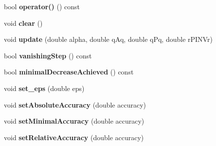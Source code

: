 \begin{DoxyCompactItemize}
\item 
\hypertarget{classSpacy_1_1CG_1_1TerminationCriterion_ab109eb287dd3622db54bbbdf0a55660a}{bool {\bfseries operator()} () const }\label{classSpacy_1_1CG_1_1TerminationCriterion_ab109eb287dd3622db54bbbdf0a55660a}

\item 
\hypertarget{classSpacy_1_1CG_1_1TerminationCriterion_a347651c14a38ce3bf1c92454aded97ab}{void {\bfseries clear} ()}\label{classSpacy_1_1CG_1_1TerminationCriterion_a347651c14a38ce3bf1c92454aded97ab}

\item 
\hypertarget{classSpacy_1_1CG_1_1TerminationCriterion_a4ef7ad43f594bab9b21f60e36697c516}{void {\bfseries update} (double alpha, double q\-Aq, double q\-Pq, double r\-P\-I\-N\-Vr)}\label{classSpacy_1_1CG_1_1TerminationCriterion_a4ef7ad43f594bab9b21f60e36697c516}

\item 
\hypertarget{classSpacy_1_1CG_1_1TerminationCriterion_ab92b8e27edb8290ed34c34a242f900d3}{bool {\bfseries vanishing\-Step} () const }\label{classSpacy_1_1CG_1_1TerminationCriterion_ab92b8e27edb8290ed34c34a242f900d3}

\item 
\hypertarget{classSpacy_1_1CG_1_1TerminationCriterion_a928da2a9183b773ca90477057b3d2b8b}{bool {\bfseries minimal\-Decrease\-Achieved} () const }\label{classSpacy_1_1CG_1_1TerminationCriterion_a928da2a9183b773ca90477057b3d2b8b}

\item 
\hypertarget{classSpacy_1_1CG_1_1TerminationCriterion_a3fb31dad926966448b71f65b531e411b}{void {\bfseries set\-\_\-eps} (double eps)}\label{classSpacy_1_1CG_1_1TerminationCriterion_a3fb31dad926966448b71f65b531e411b}

\item 
\hypertarget{classSpacy_1_1CG_1_1TerminationCriterion_a833711290bf75d7cf7450f163f537510}{void {\bfseries set\-Absolute\-Accuracy} (double accuracy)}\label{classSpacy_1_1CG_1_1TerminationCriterion_a833711290bf75d7cf7450f163f537510}

\item 
\hypertarget{classSpacy_1_1CG_1_1TerminationCriterion_a5e16822944d08001fde24212857f4b2a}{void {\bfseries set\-Minimal\-Accuracy} (double accuracy)}\label{classSpacy_1_1CG_1_1TerminationCriterion_a5e16822944d08001fde24212857f4b2a}

\item 
\hypertarget{classSpacy_1_1CG_1_1TerminationCriterion_acea2a40d3f62813a3daa69ebbe8f2d16}{void {\bfseries set\-Relative\-Accuracy} (double accuracy)}\label{classSpacy_1_1CG_1_1TerminationCriterion_acea2a40d3f62813a3daa69ebbe8f2d16}


\end{DoxyCompactItemize}
